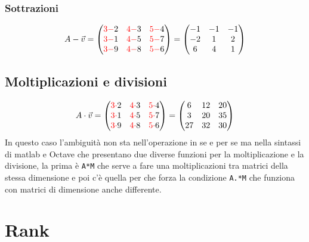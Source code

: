 \documentclass{book}
\begin{document}
\subsubsection{Sottrazioni}
\label{sec:sottvectmtx}
\begin{eqnarray*}
   A-\vec{v} =
  \begin{pmatrix}
    {\color{red}3-}2 & {\color{red}4-}3 & {\color{red}5-}4\\
    {\color{red}3-}1 & {\color{red}4-}5 & {\color{red}5-}7\\
    {\color{red}3-}9 & {\color{red}4-}8 & {\color{red}5-}6        
  \end{pmatrix}=
  \begin{pmatrix}
    -1 & -1 & -1\\
    -2 & 1 & 2 \\
    6 & 4 & 1
  \end{pmatrix}
\end{eqnarray*}

\subsection{Moltiplicazioni e divisioni}
\label{sec:moltedivvetmtx}
\begin{eqnarray*}
   A\cdot\vec{v} =
  \begin{pmatrix}
    {\color{red}3\cdot}2 & {\color{red}4\cdot}3 & {\color{red}5\cdot}4\\
    {\color{red}3\cdot}1 & {\color{red}4\cdot}5 & {\color{red}5\cdot}7\\
    {\color{red}3\cdot}9 & {\color{red}4\cdot}8 & {\color{red}5\cdot}6        
  \end{pmatrix}=
  \begin{pmatrix}
    6 & 12 & 20\\
    3 & 20 & 35\\
    27 & 32 & 30
  \end{pmatrix}
\end{eqnarray*}
In questo caso l'ambiguità non sta nell'operazione in se e per se ma nella sintassi di
matlab e Octave che presentano due diverse funzioni per la moltiplicazione e la
divisione, la prima è \lstinline|A*M| che serve a fare una moltiplicazioni tra matrici
della stessa dimensione e poi c'è quella per che forza la condizione \lstinline|A.*M|
che funziona con matrici di dimensione anche differente.

\section{Rank}
\label{sec:rank}
\end{document}
